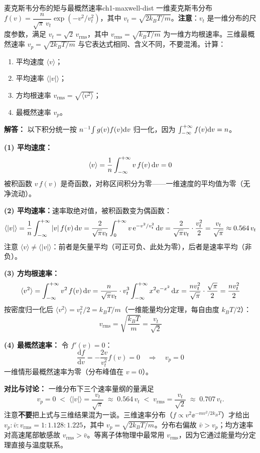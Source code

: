 \begin{example}{麦克斯韦分布的矩与最概然速率}{ch1-maxwell-dist}
一维麦克斯韦分布 $f(v) = \dfrac{n}{\sqrt{\pi}\,v_t}\exp(-v^2/v_t^2)$，其中 $v_t = \sqrt{2k_{\!B}T/m}$。\textbf{注意}：$v_t$ 是一维分布的尺度参数，满足 $v_t = \sqrt{2}\,v_{\mathrm{rms}}$，其中 $v_{\mathrm{rms}}=\sqrt{k_{\!B}T/m}$ 为一维方均根速率。三维最概然速率 $v_p=\sqrt{2k_{\!B}T/m}$ 与它表达式相同、含义不同，不要混淆。计算：
\begin{enumerate}[label=(\arabic*)]
\item 平均速度 $\langle v\rangle$；
\item 平均速率 $\langle|v|\rangle$；
\item 方均根速率 $v_{\mathrm{rms}}=\sqrt{\langle v^2\rangle}$；
\item 最概然速率 $v_p$。
\end{enumerate}
\tcblower
\textbf{解答：}
以下积分统一按 $n^{-1}\!\int g(v)f(v)\mathrm{d} v$ 归一化，因为 $\int_{-\infty}^{+\infty} f(v)\mathrm{d} v = n$。

\textbf{(1) 平均速度：}
\[
\langle v\rangle = \frac{1}{n}\int_{-\infty}^{+\infty} v\,f(v)\,\mathrm{d} v = 0
\]
被积函数 $v\,f(v)$ 是奇函数，对称区间积分为零——一维速度的平均值为零（无净流动）。

\textbf{(2) 平均速率：}速率取绝对值，被积函数变为偶函数：
\[
\langle|v|\rangle = \frac{1}{n}\int_{-\infty}^{+\infty} |v|\,f(v)\,\mathrm{d} v
= \frac{2}{\sqrt{\pi}v_t}\int_{0}^{+\infty} v\,\mathrm{e}^{-v^2/v_t^2}\,\mathrm{d} v
= \frac{2}{\sqrt{\pi}v_t}\cdot\frac{v_t^2}{2}
= \frac{v_t}{\sqrt{\pi}} \approx 0.564\,v_t
\]
注意 $\langle v\rangle \ne \langle|v|\rangle$：前者是矢量平均（可正可负、此处为零），后者是速率平均（非负）。

\textbf{(3) 方均根速率：}
\[
\langle v^2\rangle = \int_{-\infty}^{+\infty} v^2\,f(v)\,\mathrm{d} v = \frac{n}{\sqrt{\pi}v_t}\cdot v_t^3\int_{-\infty}^{+\infty} x^2\mathrm{e}^{-x^2}\,\mathrm{d} x = \frac{n v_t^2}{\sqrt{\pi}}\cdot\frac{\sqrt{\pi}}{2} = \frac{n v_t^2}{2}
\]
按密度归一化后 $\langle v^2\rangle = v_t^2/2 = k_{\!B}T/m$（一维能量均分定理，每自由度 $k_{\!B}T/2$）：
\[
v_{\mathrm{rms}} = \sqrt{\frac{k_{\!B}T}{m}} = \frac{v_t}{\sqrt{2}}
\]

\textbf{(4) 最概然速率：} 令 $f'(v)=0$：
\[
\frac{\mathrm{d}f}{\mathrm{d}v} = -\frac{2v}{v_t^2}f(v) = 0 \quad\Rightarrow\quad v_p = 0
\]
一维情形最概然速率为零（分布峰值在 $v=0$）。

\textbf{对比与讨论：} 一维分布下三个速率量纲的量满足
\[
v_p = 0 \;<\; \langle|v|\rangle = \frac{v_t}{\sqrt{\pi}} \;\approx\; 0.564\,v_t \;<\; v_{\mathrm{rms}} = \frac{v_t}{\sqrt{2}} \;\approx\; 0.707\,v_t .
\]
注意\textbf{不要}把上式与三维结果混为一谈。三维速率分布（$f\propto v^2\ee^{-mv^2/2k_BT}$）才给出 $v_p : \bar v : v_{\mathrm{rms}} = 1 : 1.128 : 1.225$，其中 $v_p=\sqrt{2k_BT/m}$。分布右偏故 $\bar v > v_p$；均方速率对高速尾部敏感故 $v_{\mathrm{rms}} > \bar v$。等离子体物理中最常用 $v_{\mathrm{rms}}$，因为它通过能量均分定理直接与温度联系。
\end{example}

